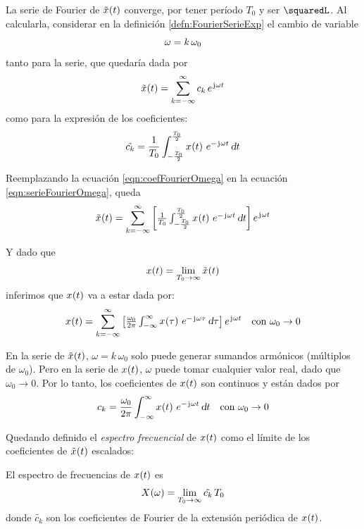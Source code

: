La serie de Fourier de $\fx[\tilde{x}]{t}$ converge, por tener período $T_0$ y ser $\squaredL$.
Al calcularla, considerar en la definición \ref{defn:FourierSerieExp} el cambio de variable
\[
    \omega = \kth \, \omega_0
\]
tanto para la serie, que quedaría dada por
\begin{equation}
    \fx[\tilde{x}]{t}
    = \sum_{\kth=-\infty}^\infty
    c_\kth \, \complexExp
    \label{eqn:serieFourierOmega}
\end{equation}
como para la expresión de los coeficientes:
\begin{equation}
    \tilde{c_\kth} =
    \frac{1}{T_0}
    \int_{-\frac{T_0}{2}}^{\frac{T_0}{2}} \fx[x]{t} \, e^{- \iu \omega t}
    \, \dif t
    \label{eqn:coefFourierOmega}
\end{equation}

Reemplazando la ecuación \ref{eqn:coefFourierOmega} en la ecuación \ref{eqn:serieFourierOmega}, queda
\[
    \fx[\tilde{x}]{t}
    = \sum_{\kth=-\infty}^\infty
    \inBrackets{
    \frac{1}{T_0}
    \int_{-\frac{T_0}{2}}^{\frac{T_0}{2}} \fx[x]{t} \, e^{- \iu \omega t}
    \, \dif t
    }
    \, \complexExp
\]

Y dado que
\[
    \fx[x]{t} = \lim_{T_0 \to \infty} \fx[\tilde{x}]{t}
\]
inferimos que $\fx[x]{t}$ va a estar dada por:
\[
    \fx[x]{t}
    = \sum_{\kth=-\infty}^\infty
    \inBrackets{ \frac{\omega_0}{2 \pi} \int_{-\infty}^{\infty} \fx[x]{\tau} \, e^{- \iu \omega \tau} \, \dif \tau }
    \, \complexExp
    \quad \text{con } \omega_0 \to 0
\]

En la serie de $\fx[\tilde{x}]{t}$, $\omega = k \, \omega_0$ solo puede generar sumandos armónicos (múltiplos de $\omega_0$).
Pero en la serie de $\fx[x]{t}$, $\omega$ puede tomar cualquier valor real, dado que $\omega_0 \to 0$.
Por lo tanto, los coeficientes de $\fx[x]{t}$ son continuos y están dados por
\[
    c_\kth =
    \frac{\omega_0}{2 \pi}
    \int_{-\infty}^\infty \fx[x]{t} \, e^{- \iu \omega t}
    \, \dif t
    \quad \text{con } \omega_0 \to 0
\]

Quedando definido el \emph{espectro frecuencial} de $\fx[x]{t}$ como el límite de los coeficientes de $\fx[\tilde{x}]{t}$ escalados:

\begin{mdframed}[style=DefinitionFrame]
    \begin{defn}
    \end{defn}

    El espectro de frecuencias de $\fx[x]{t}$ es
    \[
        \fx[X]{\omega} = \lim_{T_0 \to \infty} \tilde{c_k} \, T_0
    \]
    donde $\tilde{c_k}$ son los coeficientes de Fourier de la extensión periódica de $\fx[x]{t}$.
\end{mdframed}

